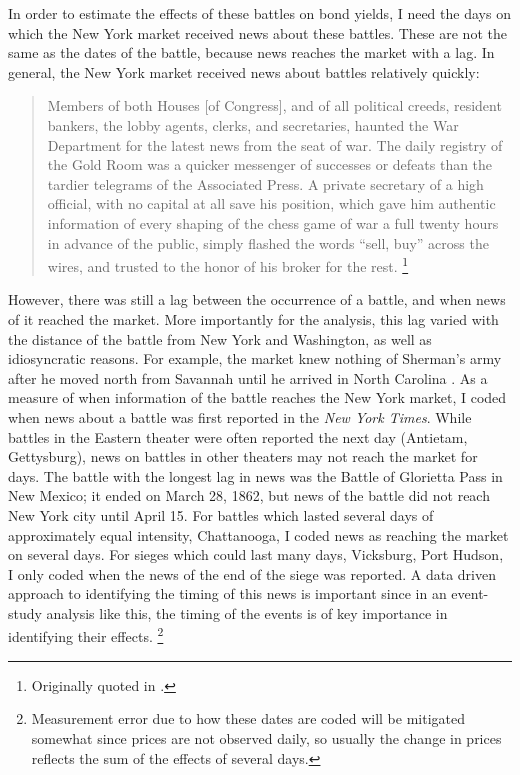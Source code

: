



In order to estimate the effects of these battles on bond yields, I need the days on which the New York market received news about these battles.
These are not the same as the dates of the battle, because news reaches the market with a lag.
In general, the New York market received news about battles relatively quickly:
\begin{quote}
Members of both Houses [of Congress], and of all political creeds, resident bankers, the lobby agents, clerks, and secretaries, haunted the War Department for the latest news from the seat of war.
The daily registry of the Gold Room was a quicker messenger of successes or defeats than the tardier telegrams of the Associated Press. A private secretary of a high official, with no capital at all save his position, which gave him authentic information of every shaping of the chess game of war a full twenty hours in advance of the public, simply flashed the words ``sell, buy'' across the wires, and trusted to the honor of his broker for the rest. \parencite[245]{Medbery1870a}\footnote{Originally quoted in \textcite{WillardGuinnaneEtAl1996}.}
\end{quote}
However, there was still a lag between the occurrence of a battle, and when news of it reached the market.
More importantly for the analysis, this lag varied with the distance of the battle from New York and Washington, as well as idiosyncratic reasons.
For example, the market knew nothing of Sherman's army after he moved north from Savannah until he arrived in North Carolina \parencite[204]{Mitchell1903}.
As a measure of when information of the battle reaches the New York market, I coded when news about a battle was first reported in the \textit{New York Times}.
While battles in the Eastern theater were often reported the next day (Antietam, Gettysburg), news on battles in other theaters may not reach the market for days.
The battle with the longest lag in news was the Battle of Glorietta Pass in New Mexico; it ended on March 28, 1862, but news of the battle did not reach New York city until April 15.
For battles which lasted several days of approximately equal intensity, \eg{}Chattanooga, I coded news as reaching the market on several days.
For sieges which could last many days, \eg{}Vicksburg, Port Hudson, I only coded when the news of the end of the siege was reported.
A data driven approach to identifying the timing of this news is important since in an event-study analysis like this, the timing of the events is of key importance in identifying their effects.
\footnote{
  Measurement error due to how these dates are coded will be mitigated somewhat since prices are not observed daily, so usually the change in prices reflects the sum of the effects of several days.
}

